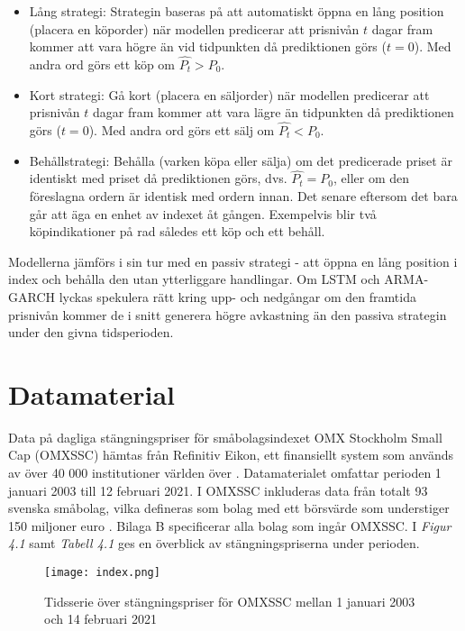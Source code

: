 \documentclass[11pt]{article}
\numberwithin{equation}{section}
\numberwithin{table}{section}
\numberwithin{figure}{section}
\begin{document}
\begin{itemize}
    \item Lång strategi: Strategin baseras på att automatiskt öppna en lång position (placera en köporder) när modellen predicerar att prisnivån $t$ dagar fram kommer att vara högre än vid tidpunkten då prediktionen görs ($t=0$). Med andra ord görs ett köp om $\hat{P_t} > P_0$.
    \item Kort strategi: Gå kort (placera en säljorder) när modellen predicerar att prisnivån $t$ dagar fram kommer att vara lägre än tidpunkten då prediktionen görs ($t=0$). Med andra ord görs ett sälj om $\hat{P_t} < P_0$.
    \item Behållstrategi: Behålla (varken köpa eller sälja) om det predicerade priset är identiskt med priset då prediktionen görs, dvs. $\hat{P_t} = P_0$, eller om den föreslagna ordern är identisk med ordern innan. Det senare eftersom det bara går att äga en enhet av indexet åt gången. Exempelvis blir två köpindikationer på rad således ett köp och ett behåll.
\end{itemize}

Modellerna jämförs i sin tur med en passiv strategi - att öppna en lång position i index och behålla den utan ytterliggare handlingar. Om LSTM och ARMA-GARCH lyckas spekulera rätt kring upp- och nedgångar om den framtida prisnivån kommer de i snitt generera högre avkastning än den passiva strategin under den givna tidsperioden.

\newpage
\section{Datamaterial}

Data på dagliga stängningspriser för småbolagsindexet OMX Stockholm Small Cap (OMXSSC) hämtas från Refinitiv Eikon, ett finansiellt system som används av över 40 000 institutioner världen över \parencite{Eikon}. Datamaterialet omfattar perioden 1 januari 2003 till 12 februari 2021. I OMXSSC inkluderas data från totalt 93 svenska småbolag, vilka defineras som bolag med ett börsvärde som understiger 150 miljoner euro \parencite{smabalagsdefinition}. Bilaga B specificerar alla bolag som ingår OMXSSC. I \emph{Figur 4.1} samt \textit{Tabell 4.1} ges en överblick av stängningspriserna under perioden. 

\begin{figure}[H]
\caption{Tidsserie över stängningspriser för OMXSSC mellan 1 januari 2003 och 14 februari 2021}
\texttt{[image: index.png]}
\centering
\end{figure}
\end{document}
